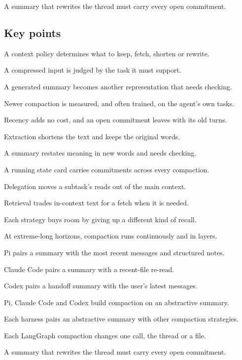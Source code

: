 \begin{takeaway}A summary that rewrites the thread must carry every open commitment.\end{takeaway}

\subsection*{Key points}
\bi
\item A context policy determines what to keep, fetch, shorten or rewrite.
\item A compressed input is judged by the task it must support.
\item A generated summary becomes another representation that needs checking.
\item Newer compaction is measured, and often trained, on the agent's own tasks.
\item Recency adds no cost, and an open commitment leaves with its old turns.
\item Extraction shortens the text and keeps the original words.
\item A summary restates meaning in new words and needs checking.
\item A running state card carries commitments across every compaction.
\item Delegation moves a subtask's reads out of the main context.
\item Retrieval trades in-context text for a fetch when it is needed.
\item Each strategy buys room by giving up a different kind of recall.
\item At extreme-long horizons, compaction runs continuously and in layers.
\item Pi pairs a summary with the most recent messages and structured notes.
\item Claude Code pairs a summary with a recent-file re-read.
\item Codex pairs a handoff summary with the user's latest messages.
\item Pi, Claude Code and Codex build compaction on an abstractive summary.
\item Each harness pairs an abstractive summary with other compaction strategies.
\item Each LangGraph compaction changes one call, the thread or a file.
\item A summary that rewrites the thread must carry every open commitment.
\ei
